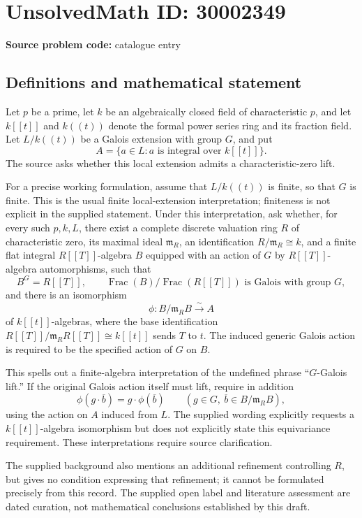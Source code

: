 \documentclass[11pt]{article}
\begin{document}
\section*{UnsolvedMath ID: 30002349}
\textbf{Source problem code:} catalogue entry
\subsection{Definitions and mathematical statement}
Let \(p\) be a prime, let \(k\) be an algebraically closed field of characteristic \(p\), and let \(k[[t]]\) and \(k((t))\) denote the formal power series ring and its fraction field. Let \(L/k((t))\) be a Galois extension with group \(G\), and put
\[
A=\{a\in L:a\text{ is integral over }k[[t]]\}.
\]
The source asks whether this local extension admits a characteristic-zero lift.

For a precise working formulation, assume that \(L/k((t))\) is finite, so that \(G\) is finite. This is the usual finite local-extension interpretation; finiteness is not explicit in the supplied statement. Under this interpretation, ask whether, for every such \(p,k,L\), there exist a complete discrete valuation ring \(R\) of characteristic zero, its maximal ideal \(\mathfrak m_R\), an identification \(R/\mathfrak m_R\cong k\), and a finite flat integral \(R[[T]]\)-algebra \(B\) equipped with an action of \(G\) by \(R[[T]]\)-algebra automorphisms, such that
\[
B^G=R[[T]],\qquad
\operatorname{Frac}(B)/\operatorname{Frac}(R[[T]])
\text{ is Galois with group }G,
\]
and there is an isomorphism
\[
\phi:B/\mathfrak m_RB\xrightarrow{\ \sim\ }A
\]
of \(k[[t]]\)-algebras, where the base identification
\(R[[T]]/\mathfrak m_RR[[T]]\cong k[[t]]\) sends \(T\) to \(t\). The induced generic Galois action is required to be the specified action of \(G\) on \(B\).

This spells out a finite-algebra interpretation of the undefined phrase ``\(G\)-Galois lift.'' If the original Galois action itself must lift, require in addition
\[
\phi(g\cdot\overline b)=g\cdot\phi(\overline b)
\qquad(g\in G,\ \overline b\in B/\mathfrak m_RB),
\]
using the action on \(A\) induced from \(L\). The supplied wording explicitly requests a \(k[[t]]\)-algebra isomorphism but does not explicitly state this equivariance requirement. These interpretations require source clarification.

The supplied background also mentions an additional refinement controlling \(R\), but gives no condition expressing that refinement; it cannot be formulated precisely from this record. The supplied open label and literature assessment are dated curation, not mathematical conclusions established by this draft.
\end{document}
